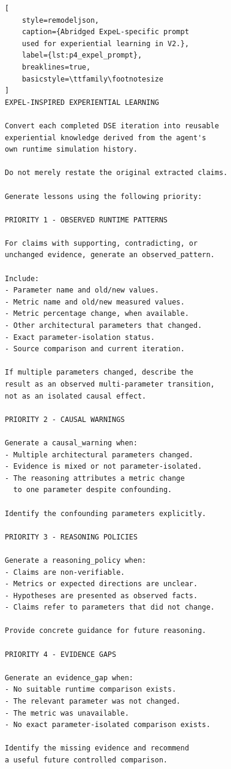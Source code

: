 \begin{lstlisting}[
    style=remodeljson,
    caption={Abridged ExpeL-specific prompt
    used for experiential learning in V2.},
    label={lst:p4_expel_prompt},
    breaklines=true,
    basicstyle=\ttfamily\footnotesize
]
EXPEL-INSPIRED EXPERIENTIAL LEARNING

Convert each completed DSE iteration into reusable
experiential knowledge derived from the agent's
own runtime simulation history.

Do not merely restate the original extracted claims.

Generate lessons using the following priority:

PRIORITY 1 - OBSERVED RUNTIME PATTERNS

For claims with supporting, contradicting, or
unchanged evidence, generate an observed_pattern.

Include:
- Parameter name and old/new values.
- Metric name and old/new measured values.
- Metric percentage change, when available.
- Other architectural parameters that changed.
- Exact parameter-isolation status.
- Source comparison and current iteration.

If multiple parameters changed, describe the
result as an observed multi-parameter transition,
not as an isolated causal effect.

PRIORITY 2 - CAUSAL WARNINGS

Generate a causal_warning when:
- Multiple architectural parameters changed.
- Evidence is mixed or not parameter-isolated.
- The reasoning attributes a metric change
  to one parameter despite confounding.

Identify the confounding parameters explicitly.

PRIORITY 3 - REASONING POLICIES

Generate a reasoning_policy when:
- Claims are non-verifiable.
- Metrics or expected directions are unclear.
- Hypotheses are presented as observed facts.
- Claims refer to parameters that did not change.

Provide concrete guidance for future reasoning.

PRIORITY 4 - EVIDENCE GAPS

Generate an evidence_gap when:
- No suitable runtime comparison exists.
- The relevant parameter was not changed.
- The metric was unavailable.
- No exact parameter-isolated comparison exists.

Identify the missing evidence and recommend
a useful future controlled comparison.


\end{lstlisting}
